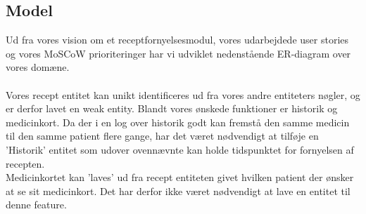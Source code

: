 \subsection{Model}
Ud fra vores vision om et receptfornyelsesmodul, vores udarbejdede user stories og vores MoSCoW prioriteringer har vi udviklet nedenstående ER-diagram over vores domæne.\\
\\
Vores recept entitet kan unikt identificeres ud fra vores andre entiteters nøgler, og er derfor lavet en weak entity. Blandt vores ønskede funktioner er historik og medicinkort. Da der i en log over historik godt kan fremstå den samme medicin til den samme patient flere gange, har det været nødvendigt at tilføje en 'Historik' entitet som udover ovennævnte kan holde tidspunktet for fornyelsen af recepten.\\
Medicinkortet kan 'laves' ud fra recept entiteten givet hvilken patient der ønsker at se sit medicinkort. Det har derfor ikke været nødvendigt at lave en entitet til denne feature.\\

